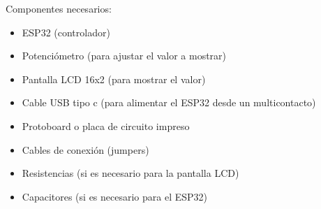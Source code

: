      Componentes necesarios: 
    \begin{itemize}

    \item ESP32 (controlador)
    \item Potenciómetro (para ajustar el valor a mostrar)
    \item Pantalla LCD 16x2 (para mostrar el valor)
    \item Cable USB tipo c (para alimentar el ESP32 desde un multicontacto)
    \item Protoboard o placa de circuito impreso
    \item Cables de conexión (jumpers)
    \item Resistencias (si es necesario para la pantalla LCD)
    \item Capacitores (si es necesario para el ESP32)

    \end{itemize}

